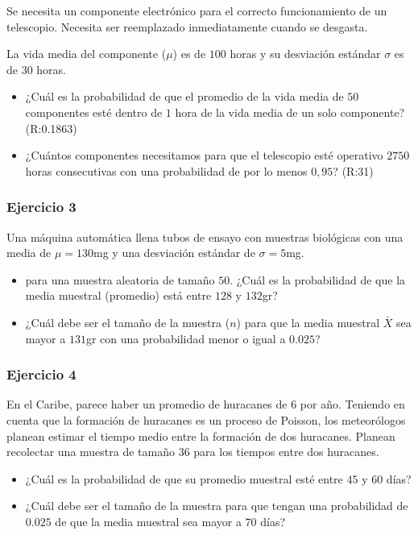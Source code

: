 \documentclass[
]{book}
\begin{document}
Se necesita un componente electrónico para el correcto funcionamiento de un telescopio. Necesita ser reemplazado inmediatamente cuando se desgasta.

La vida media del componente (\(\mu\)) es de \(100\) horas y su desviación estándar \(\sigma\) es de \(30\) horas.

\begin{itemize}
\item
  ¿Cuál es la probabilidad de que el promedio de la vida media de \(50\) componentes esté dentro de \(1\) hora de la vida media de un solo componente? (R:0.1863)
\item
  ¿Cuántos componentes necesitamos para que el telescopio esté operativo \(2750\) horas consecutivas con una probabilidad de por lo menos \(0,95\)? (R:31)
\end{itemize}

\hypertarget{ejercicio-3-3}{%
\subsubsection{Ejercicio 3}\label{ejercicio-3-3}}

Una máquina automática llena tubos de ensayo con muestras biológicas con una media de \(\mu=130\)mg y una desviación estándar de \(\sigma=5\)mg.

\begin{itemize}
\item
  para una muestra aleatoria de tamaño \(50\). ¿Cuál es la probabilidad de que
  la media muestral (promedio) está entre \(128\) y \(132\)gr?
\item
  ¿Cuál debe ser el tamaño de la muestra (\(n\)) para que la media muestral \(\bar{X}\) sea mayor a \(131\)gr con una probabilidad menor o igual a \(0.025\)?
\end{itemize}

\hypertarget{ejercicio-4-3}{%
\subsubsection{Ejercicio 4}\label{ejercicio-4-3}}

En el Caribe, parece haber un promedio de huracanes de \(6\) por año. Teniendo en cuenta que la formación de huracanes es un proceso de Poisson, los meteorólogos planean estimar el tiempo medio entre la formación de dos huracanes. Planean recolectar una muestra de tamaño \(36\) para los tiempos entre dos huracanes.

\begin{itemize}
\item
  ¿Cuál es la probabilidad de que su promedio muestral esté entre \(45\) y \(60\) días?
\item
  ¿Cuál debe ser el tamaño de la muestra para que tengan una probabilidad de \(0.025\) de que la media muestral sea mayor a \(70\) días?
\end{itemize}
\end{document}
